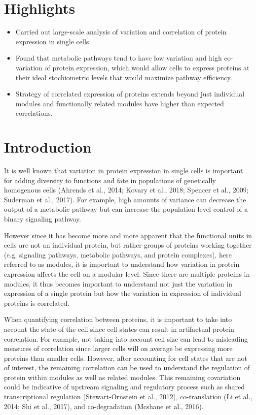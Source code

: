 \section{Highlights}
\begin{itemize}
\item Carried out large-scale analysis of variation and correlation of protein expression in single cells
\item Found that metabolic pathways tend to have low variation and high co-variation of protein expression, which would allow cells to express proteins at their ideal stochiometric levels that would maximize pathway efficiency.
\item Strategy of correlated expression of proteins extends beyond just individual modules and functionally related modules have higher than expected correlations.
\end{itemize}

\section{Introduction}
It is well known that variation in protein expression in single cells is important for adding diversity to functions and fate in populations of genetically homogenous cells (Ahrends et al., 2014; Kovary et al., 2018; Spencer et al., 2009; Suderman et al., 2017).  For example, high amounts of variance can decrease the output of a metabolic pathway but can increase the population level control of a binary signaling pathway. 

However since it has become more and more apparent that the functional units in cells are not an individual protein, but rather groups of proteins working together (e.g. signaling pathways, metabolic pathways, and protein complexes), here referred to as modules, it is important to understand how variation in protein expression affects the cell on a modular level. Since there are multiple proteins in modules, it thus becomes important to understand not just the variation in expression of a single protein but how the variation in expression of individual proteins is correlated.

When quantifying correlation between proteins, it is important to take into account the state of the cell since cell states can result in artifactual protein correlation. For example, not taking into account cell size can lead to misleading measures of correlation since larger cells will on average be expressing more proteins than smaller cells. However, after accounting for cell states that are not of interest, the remaining correlation can be used to understand the regulation of protein within modules as well as related modules. This remaining covariation could be indicative of upstream signaling and regulatory process such as shared transcriptional regulation (Stewart-Ornstein et al., 2012), co-translation (Li et al., 2014; Shi et al., 2017), and co-degradation (Mcshane et al., 2016).

